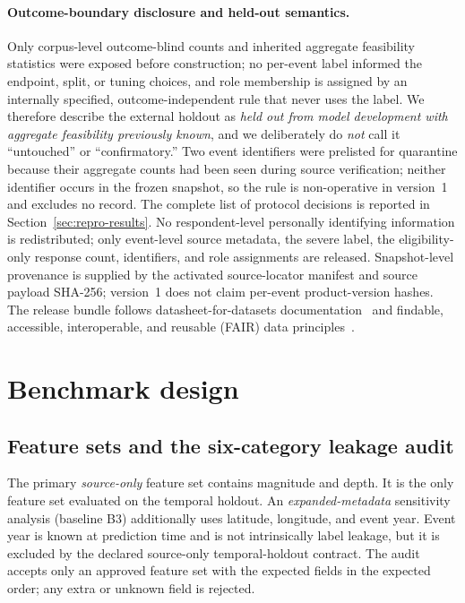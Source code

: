 \documentclass[pdflatex,sn-basic,Numbered]{sn-jnl}
\begin{document}
\paragraph{Outcome-boundary disclosure and held-out semantics.} Only corpus-level
outcome-blind counts and inherited aggregate feasibility statistics were exposed
before construction; no per-event label informed the endpoint, split, or
tuning choices, and role membership is assigned by an internally specified,
outcome-independent rule that never uses the label. We therefore describe the
external holdout as \emph{held out from model development with aggregate
feasibility previously known}, and we deliberately do \emph{not} call it
``untouched'' or ``confirmatory.'' Two event identifiers were prelisted for
quarantine because their aggregate counts had been seen during source
verification; neither identifier occurs in the frozen snapshot, so the rule is
non-operative in version~1 and excludes no record. The complete list of protocol decisions is reported in
Section~\ref{sec:repro-results}. No
respondent-level personally identifying information is redistributed; only
event-level source metadata, the severe label, the eligibility-only response
count, identifiers, and role assignments are released. Snapshot-level
provenance is supplied by the activated source-locator manifest and source
payload SHA-256; version~1 does not claim per-event product-version hashes. The
release bundle follows datasheet-for-datasets
documentation~\citep{gebru2021datasheets} and findable, accessible,
interoperable, and reusable (FAIR) data
principles~\citep{wilkinson2016fair}.

\section{Benchmark design}\label{sec:design}

\subsection{Feature sets and the six-category leakage audit}\label{sec:leakage}

The primary \emph{source-only} feature set contains magnitude and depth. It is
the only feature set evaluated on the temporal holdout. An
\emph{expanded-metadata} sensitivity analysis (baseline B3) additionally uses
latitude, longitude, and event year. Event year is known at prediction time and
is not intrinsically label leakage, but it is excluded by the declared
source-only temporal-holdout contract. The audit accepts only an approved
feature set with the expected fields in the expected order; any extra or unknown
field is rejected.
\end{document}
